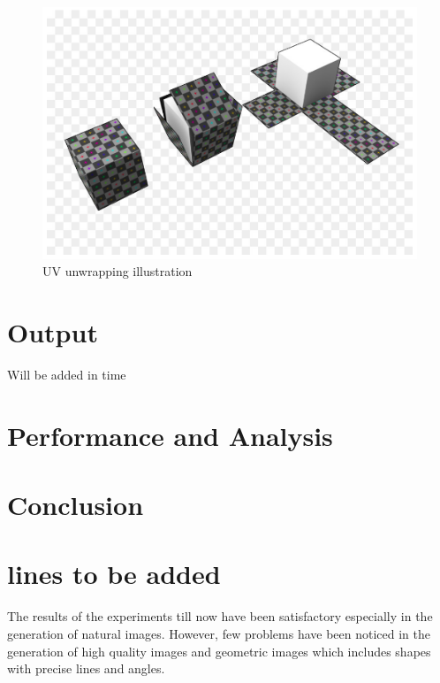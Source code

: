 \documentclass{article}
\begin{document}
\begin{figure}[H]
    \centering
    \includegraphics[width=15cm]{images/UVUnwrapping.png}
    \caption{UV unwrapping illustration}
    \label{fig:my_label}
\end{figure}


    
\newpage    
\section{Output}
Will be added in time

\section{Performance and Analysis}

 
\section{Conclusion}



\section{lines to be added}
The results of the experiments till now have been satisfactory especially in the generation of natural images. However, few problems have been noticed in the generation of high quality images and geometric images which includes shapes with precise lines and angles.
\end{document}
